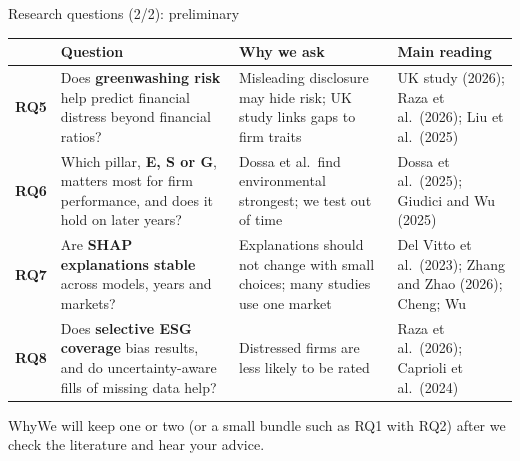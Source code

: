 \documentclass[aspectratio=169,11pt]{beamer}
\newcommand{\why}[1]{\vspace{2pt}\begin{block}{Why}#1\end{block}}
\begin{document}
\begin{frame}[t]{Research questions (2/2): preliminary}
\scriptsize
\begin{tabular}{@{}p{0.9cm}p{5.0cm}p{3.7cm}p{3.5cm}@{}}
\toprule
\rowcolor{softteal} & \textbf{Question} & \textbf{Why we ask} & \textbf{Main reading} \\
\midrule
\textbf{\color{amber!85!black}RQ5} & Does \textbf{greenwashing risk} help predict financial distress beyond financial ratios? & Misleading disclosure may hide risk; UK study links gaps to firm traits & UK study (2026); Raza et al.\ (2026); Liu et al.\ (2025) \\
\textbf{\color{amber!85!black}RQ6} & Which pillar, \textbf{E, S or G}, matters most for firm performance, and does it hold on later years? & Dossa et al.\ find environmental strongest; we test out of time & Dossa et al.\ (2025); Giudici and Wu (2025) \\
\textbf{\color{teal}RQ7} & Are \textbf{SHAP explanations stable} across models, years and markets? & Explanations should not change with small choices; many studies use one market & Del Vitto et al.\ (2023); Zhang and Zhao (2026); Cheng; Wu \\
\textbf{\color{teal}RQ8} & Does \textbf{selective ESG coverage} bias results, and do uncertainty-aware fills of missing data help? & Distressed firms are less likely to be rated & Raza et al.\ (2026); Caprioli et al.\ (2024) \\
\bottomrule
\end{tabular}
\why{We will keep one or two (or a small bundle such as RQ1 with RQ2) after we check the literature and hear your advice.}
\end{frame}
\end{document}
